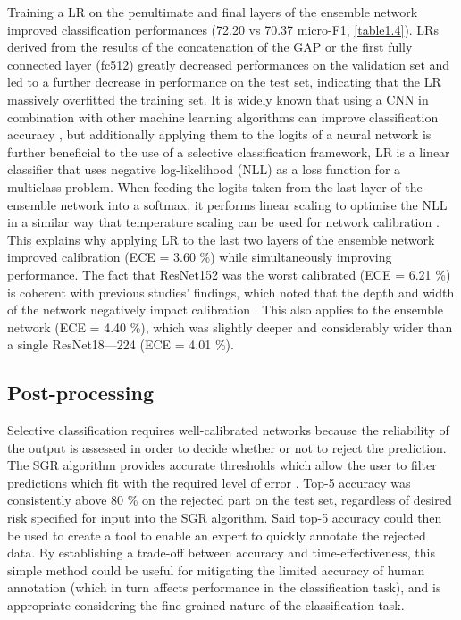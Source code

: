 Training a LR on the penultimate and final layers of the ensemble network improved classification performances (72.20 vs 70.37 micro-F1, \autoref{table1.4}). LRs derived from the results of the concatenation of the GAP or the first fully connected layer (fc512) greatly decreased performances on the validation set and led to a further decrease in performance on the test set, indicating that the LR massively overfitted the training set. It is widely known that using a CNN in combination with other machine learning algorithms can improve classification accuracy \citep{donahue_decaf:_2014, gao_combining_2017, huang_densely_2017, li_visual_2016}, but additionally applying them to the logits of a neural network is further beneficial to the use of a selective classification framework, LR is a linear classifier that uses negative log-likelihood (NLL) as a loss function for a multiclass problem. When feeding the logits taken from the last layer of the ensemble network into a softmax, it performs linear scaling to optimise the NLL in a similar way that temperature scaling can be used for network calibration \citep{guo_calibration_2017}. This explains why applying LR to the last two layers of the ensemble network improved calibration (ECE = 3.60 \%) while simultaneously improving performance. The fact that ResNet152 was the worst calibrated (ECE = 6.21 \%) is coherent with previous studies’ findings, which noted that the depth and width of the network negatively impact calibration \citep{guo_calibration_2017}. This also applies to the ensemble network (ECE = 4.40 \%), which was slightly deeper and considerably wider than a single ResNet18---224 (ECE = 4.01 \%).

\subsection{Post-processing}\label{chapitre1_7.3}
Selective classification requires well-calibrated networks because the reliability of the output is assessed in order to decide whether or not to reject the prediction. The SGR algorithm provides accurate thresholds which allow the user to filter predictions which fit with the required level of error \citep{geifman_selective_2017}. Top-5 accuracy was consistently above 80 \% on the rejected part on the test set, regardless of desired risk specified for input into the SGR algorithm. Said top-5 accuracy could then be used to create a tool to enable an expert to quickly annotate the rejected data. By establishing a trade-off between accuracy and time-effectiveness, this simple method could be useful for mitigating the limited accuracy of human annotation (which in turn affects performance in the classification task), and is appropriate considering the fine-grained nature of the classification task.

